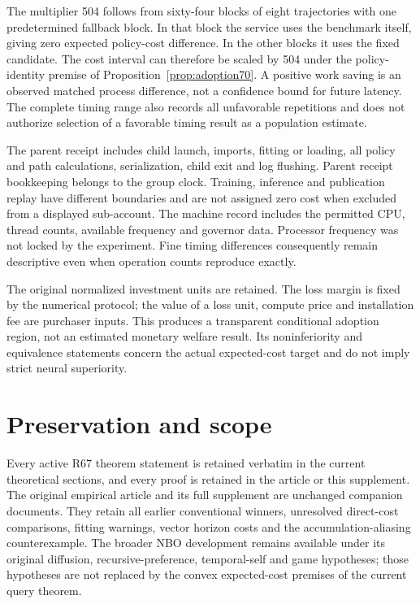 The multiplier 504 follows from sixty-four blocks of eight trajectories with one predetermined fallback block. In that block the service uses the benchmark itself, giving zero expected policy-cost difference. In the other blocks it uses the fixed candidate. The cost interval can therefore be scaled by 504 under the policy-identity premise of Proposition~\ref{prop:adoption70}. A positive work saving is an observed matched process difference, not a confidence bound for future latency. The complete timing range also records all unfavorable repetitions and does not authorize selection of a favorable timing result as a population estimate.

The parent receipt includes child launch, imports, fitting or loading, all policy and path calculations, serialization, child exit and log flushing. Parent receipt bookkeeping belongs to the group clock. Training, inference and publication replay have different boundaries and are not assigned zero cost when excluded from a displayed sub-account. The machine record includes the permitted CPU, thread counts, available frequency and governor data. Processor frequency was not locked by the experiment. Fine timing differences consequently remain descriptive even when operation counts reproduce exactly.

The original normalized investment units are retained. The loss margin is fixed by the numerical protocol; the value of a loss unit, compute price and installation fee are purchaser inputs. This produces a transparent conditional adoption region, not an estimated monetary welfare result. Its noninferiority and equivalence statements concern the actual expected-cost target and do not imply strict neural superiority.

\section{Preservation and scope}\label{supp:preservation70}
Every active R67 theorem statement is retained verbatim in the current theoretical sections, and every proof is retained in the article or this supplement. The original empirical article and its full supplement are unchanged companion documents. They retain all earlier conventional winners, unresolved direct-cost comparisons, fitting warnings, vector horizon costs and the accumulation-aliasing counterexample. The broader NBO development remains available under its original diffusion, recursive-preference, temporal-self and game hypotheses; those hypotheses are not replaced by the convex expected-cost premises of the current query theorem.

